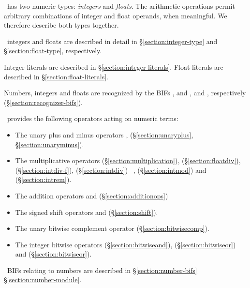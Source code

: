 \label{section:numbers}
\label{section:integers}
\label{section:floats}

\Erlang\ has two numeric types: \emph{integers} and \emph{floats}.
The arithmetic operations permit arbitrary combinations of integer and
float op\-er\-ands, when meaningful.  We therefore describe both types
together.

\Erlang\ integers and floats are described in detail in
\S\ref{section:integer-type} and \S\ref{section:float-type},
respectively.

Integer literals are described in \S\ref{section:integer-literals}.
Float literals are described in \S\ref{section:float-literals}.

Numbers, integers and floats are recognized by the BIFs
\ifStd {},  and 
\else {},  and  \fi, respectively
(\S\ref{section:recognizer-bifs}).

\Erlang\ provides the following operators acting on numeric terms:
\begin{itemize}
\item The unary plus and minus operators \T{+}, \T{-}
(\S\ref{section:unaryplus}, \S\ref{section:unaryminus}).
\item The multiplicative operators
\T{*} (\S\ref{section:multiplication}),
\T{/} (\S\ref{section:floatdiv}),
\ifStd \T{//} (\S\ref{section:intdiv-f}), \fi
{} (\S\ref{section:intdiv})\ifOld\ \fi
\ifStd,  (\S\ref{section:intmod}) \fi
and  (\S\ref{section:intrem})\ifOld.\fi

\item The addition operators \T{+} and \T{-} (\S\ref{section:additionops})
\item The signed shift operators  and  (\S\ref{section:shift}).
\item The unary bitwise complement operator 
(\S\ref{section:bitwisecomp}).
\item The integer bitwise operators  (\S\ref{section:bitwiseand}),
 (\S\ref{section:bitwiseor}) and  (\S\ref{section:bitwiseor}).
\end{itemize}

\Erlang\ BIFs relating to numbers are described in
\ifOld\S\ref{section:number-bifs}\fi
\ifStd\S\ref{section:number-module}\fi.

